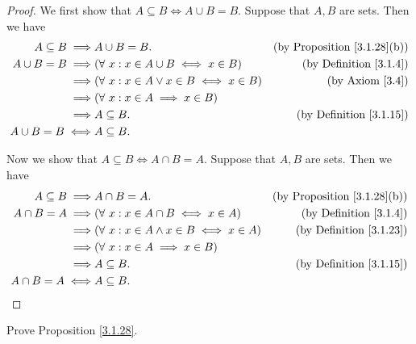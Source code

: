 \begin{proof}
    We first show that \(A \subseteq B \iff A \cup B = B\).
    Suppose that \(A, B\) are sets.
    Then we have
    \begin{align*}
        A \subseteq B \implies & A \cup B = B.                                    & \text{(by Proposition \ref{3.1.28}(b))} \\
        A \cup B = B \implies  & (\forall\ x : x \in A \cup B \iff x \in B)       & \text{(by Definition \ref{3.1.4})}      \\
        \implies               & (\forall\ x : x \in A \lor x \in B \iff x \in B) & \text{(by Axiom \ref{3.4})}             \\
        \implies               & (\forall\ x : x \in A \implies x \in B)                                                    \\
        \implies               & A \subseteq B.                                   & \text{(by Definition \ref{3.1.15})}     \\
        A \cup B = B \iff      & A \subseteq B.
    \end{align*}

    Now we show that \(A \subseteq B \iff A \cap B = A\).
    Suppose that \(A, B\) are sets.
    Then we have
    \begin{align*}
        A \subseteq B \implies & A \cap B = A.                                     & \text{(by Proposition \ref{3.1.28}(b))} \\
        A \cap B = A \implies  & (\forall\ x : x \in A \cap B \iff x \in A)        & \text{(by Definition \ref{3.1.4})}      \\
        \implies               & (\forall\ x : x \in A \land x \in B \iff x \in A) & \text{(by Definition \ref{3.1.23})}     \\
        \implies               & (\forall\ x : x \in A \implies x \in B)                                                     \\
        \implies               & A \subseteq B.                                    & \text{(by Definition \ref{3.1.15})}     \\
        A \cap B = A \iff      & A \subseteq B.
    \end{align*}
\end{proof}

\begin{exercise}\label{ex 3.1.6}
    Prove Proposition \ref{3.1.28}.
\end{exercise}

